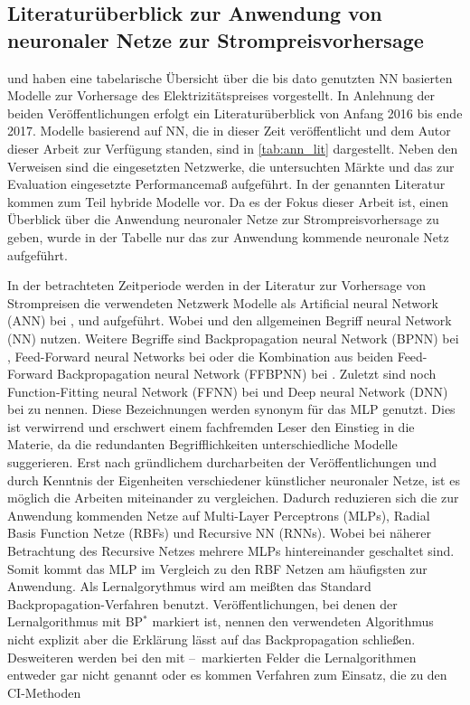 \subsection{Literaturüberblick zur Anwendung von neuronaler Netze zur Strompreisvorhersage}\label{sec:literaturueberblick}

\citet{Aggarwal2009} und \citet{Panapakidis2016} haben eine tabelarische Übersicht über die bis dato genutzten NN basierten Modelle zur Vorhersage des Elektrizitätspreises vorgestellt. In Anlehnung der beiden Veröffentlichungen erfolgt ein Literaturüberblick von Anfang 2016 bis ende 2017. 
Modelle basierend auf NN, die in dieser Zeit veröffentlicht und dem Autor dieser Arbeit zur Verfügung standen, sind in \autoref{tab:ann_lit} dargestellt. Neben den Verweisen sind die eingesetzten Netzwerke, die untersuchten Märkte und das zur Evaluation eingesetzte Performancemaß aufgeführt. In der genannten Literatur kommen zum Teil hybride Modelle vor. Da es der Fokus dieser Arbeit ist, einen Überblick über die Anwendung neuronaler Netze zur Strompreisvorhersage zu geben, wurde in der Tabelle nur das zur Anwendung kommende neuronale Netz aufgeführt. 


In der betrachteten Zeitperiode werden in der Literatur zur Vorhersage von Strompreisen die verwendeten Netzwerk Modelle als Artificial neural Network (ANN) bei \citet{Mirakyan2017}, \citet{Gao2017} und \citet{Sandhu2016} aufgeführt. Wobei \citet{Davo2016} und \citet{Domanski2017} den allgemeinen Begriff neural Network (NN) nutzen. Weitere Begriffe sind Backpropagation neural Network (BPNN) bei \citet{Wang2017}, Feed-Forward neural Networks bei \citet{Keles2016} oder die Kombination aus beiden Feed-Forward Backpropagation neural Network (FFBPNN) bei \citet{Peter2016}. Zuletzt sind noch Function-Fitting neural Network (FFNN) bei \citet{Marcos2017} und Deep neural Network (DNN) bei \citet{Lago2018} zu nennen. Diese Bezeichnungen werden synonym für das MLP genutzt. Dies ist verwirrend und erschwert einem fachfremden Leser den Einstieg in die Materie, da die redundanten Begrifflichkeiten unterschiedliche Modelle suggerieren. Erst nach gründlichem durcharbeiten der Veröffentlichungen und durch Kenntnis der Eigenheiten verschiedener künstlicher neuronaler Netze, ist es möglich die Arbeiten miteinander zu vergleichen. Dadurch reduzieren sich die zur Anwendung kommenden Netze auf Multi-Layer Perceptrons (MLPs), Radial Basis Function Netze (RBFs) und Recursive NN (RNNs). Wobei bei näherer Betrachtung des Recursive Netzes mehrere MLPs hintereinander geschaltet sind. Somit kommt das MLP im Vergleich zu den RBF Netzen am häufigsten zur Anwendung. Als Lernalgorythmus wird am meißten das Standard Backpropagation-Verfahren benutzt. Veröffentlichungen, bei denen der Lernalgorithmus mit BP$^{*}$ markiert ist, nennen den verwendeten Algorithmus nicht explizit aber die Erklärung lässt auf das Backpropagation schließen. Desweiteren werden bei den mit \glqq --\grqq~markierten Felder die Lernalgorithmen entweder gar nicht genannt oder es kommen Verfahren zum Einsatz, die zu den CI-Methoden

